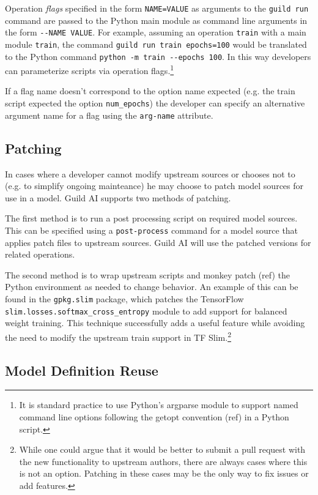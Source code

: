 \documentclass{article}
\begin{document}
Operation \emph{flags} specified in the form \verb|NAME=VALUE| as
arguments to the \verb|guild run| command are passed to the Python
main module as command line arguments in the form
\verb|--NAME VALUE|. For example, assuming an operation \verb|train|
with a main module \verb|train|, the command
\verb|guild run train epochs=100| would be translated to the Python
command \verb|python -m train --epochs 100|. In this way developers
can parameterize scripts via operation flags.\footnote{It is standard
  practice to use Python's argparse module to support named command
  line options following the getopt convention (ref) in a Python
  script.}

If a flag name doesn't correspond to the option name expected
(e.g. the train script expected the option \verb|num_epochs|) the
developer can specify an alternative argument name for a flag using
the \verb|arg-name| attribute.

\subsection{Patching}

In cases where a developer cannot modify upstream sources or chooses
not to (e.g. to simplify ongoing mainteance) he may choose to patch
model sources for use in a model. Guild AI supports two methods of
patching.

The first method is to run a post processing script on required model
sources. This can be specified using a \verb|post-process| command for
a model source that applies patch files to upstream sources. Guild AI
will use the patched versions for related operations.

The second method is to wrap upstream scripts and monkey patch (ref)
the Python environment as needed to change behavior. An example of
this can be found in the \verb|gpkg.slim| package, which patches the
TensorFlow \verb|slim.losses.softmax_cross_entropy| module to add
support for balanced weight training. This technique successfully adds
a useful feature while avoiding the need to modify the upstream train
support in TF Slim.\footnote{While one could argue that it would be
  better to submit a pull request with the new functionality to
  upstream authors, there are always cases where this is not an
  option. Patching in these cases may be the only way to fix issues or
  add features.}

\subsection{Model Definition Reuse}
\end{document}
